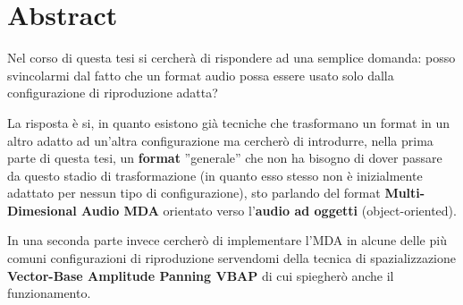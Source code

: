 \documentclass[12pt,a4paper]{report}
\begin{document}
\tableofcontents

\listoffigures



\chapter*{Abstract}

Nel corso di questa tesi si cercherà di rispondere ad una semplice domanda: posso svincolarmi dal fatto che un format audio possa essere usato solo dalla configurazione di riproduzione adatta? %


La risposta è si, in quanto esistono già tecniche che trasformano un format in un altro adatto ad un'altra configurazione ma cercherò di introdurre, nella prima parte di questa tesi, un \textbf{format} ''generale'' che non ha bisogno di dover passare da questo stadio di trasformazione (in quanto esso stesso non è inizialmente adattato per nessun tipo di configurazione), sto parlando del format \textbf{Multi-Dimesional Audio MDA} orientato verso l'\textbf{audio ad oggetti} (object-oriented).



In una seconda parte invece cercherò di implementare l'MDA in alcune delle più comuni configurazioni di riproduzione servendomi della tecnica di spazializzazione \textbf{Vector-Base Amplitude Panning VBAP} di cui spiegherò anche il funzionamento.
\end{document}
